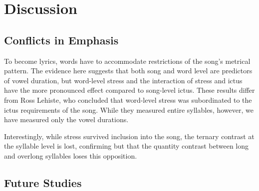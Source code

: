 \chapter{Discussion}
%

\section{Conflicts in Emphasis}
To become lyrics, words have to accommodate restrictions of the song's metrical pattern. The evidence here suggests that both song and word level are predictors of vowel duration, but word-level stress and the interaction of stress and ictus have the more pronounced effect compared to song-level ictus. 
These results differ from Ross Lehiste, who concluded that word-level stress was subordinated to the ictus requirements of the song. While they measured entire syllables, however, we have measured only the vowel durations. 

Interestingly, while stress survived inclusion into the song, the ternary contrast at the syllable level is lost, confirming \citep{lostprosodicoppositions}
but that the quantity contrast between long and overlong syllables loses this opposition. 


\section{Future Studies} 

